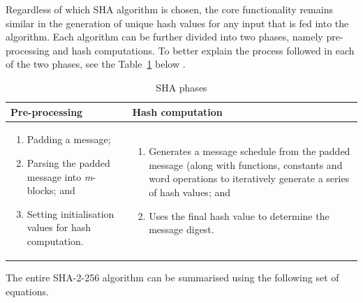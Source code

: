     Regardless of which SHA algorithm is chosen, the core functionality remains similar in the generation of unique hash values for any input that is fed into the algorithm. Each algorithm can be further divided into two phases, namely pre-processing and hash computations. To better explain the process followed in each of the two phases, see the Table~\ref{table: SHA phases} below \citep{Foti2015}.
    
    
    \begin{table}[h]
        \caption{SHA phases}
        \begin{tabular}{|p{} | p{}|}
          \hline
         \textbf{Pre-processing} & \textbf{Hash computation} \\
         \hline\hline
            \begin{enumerate}
                \item Padding a message;
                \item Parsing the padded message into \newline \textit{m}-blocks; and
                \item Setting initialisation values for hash computation.
            \end{enumerate}
             & 
             \begin{enumerate}
                 \item Generates a message schedule from the padded message (along with functions, constants and word operations to iteratively generate a series of hash values; and
                 \item Uses the final hash value to determine the message digest.
             \end{enumerate} \\
             \hline
        \end{tabular}
        \label{table: SHA phases}
    \end{table}
    
    The entire SHA-2-256 algorithm can be summarised using the following set of equations.
    
    
